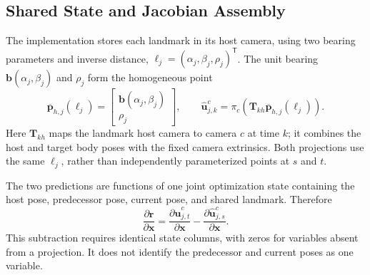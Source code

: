 \subsection{Shared State and Jacobian Assembly}

The implementation stores each landmark in its host camera, using two bearing
parameters and inverse distance,
$\boldsymbol{\ell}_j=(\alpha_j,\beta_j,\rho_j)^{\mathsf T}$.
The unit bearing $\mathbf b(\alpha_j,\beta_j)$ and $\rho_j$ form the homogeneous
point
\begin{equation}
  \overline{\mathbf p}_{h,j}(\boldsymbol{\ell}_j)
    = \begin{bmatrix}\mathbf b(\alpha_j,\beta_j)\\ \rho_j\end{bmatrix},
  \qquad
  \widehat{\mathbf u}_{j,k}^{c}
    = \pi_c\!\left(\mathbf T_{kh}
             \overline{\mathbf p}_{h,j}(\boldsymbol{\ell}_j)\right).
\end{equation}
Here $\mathbf T_{kh}$ maps the landmark host camera to camera $c$ at time $k$;
it combines the host and target body poses with the fixed camera extrinsics.
Both projections use the same $\boldsymbol{\ell}_j$, rather than independently
parameterized points at $s$ and $t$.

The two predictions are functions of one joint optimization state containing
the host pose, predecessor pose, current pose, and shared landmark. Therefore
\begin{equation}
  \frac{\partial\mathbf r}{\partial\mathbf x}
    = \frac{\partial\widehat{\mathbf u}_{j,t}^{c}}{\partial\mathbf x}
      -\frac{\partial\widehat{\mathbf u}_{j,s}^{c}}{\partial\mathbf x}.
\end{equation}
This subtraction requires identical state columns, with zeros for variables
absent from a projection. It does not identify the predecessor and current
poses as one variable.


